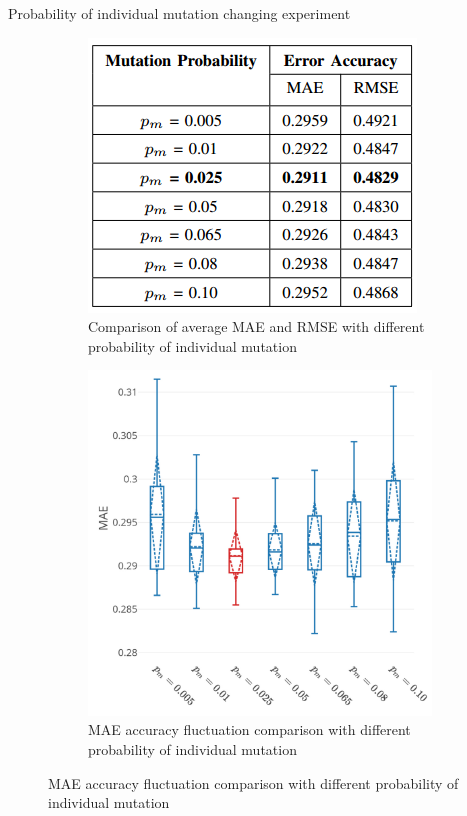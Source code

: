 \documentclass{beamer}
\newcommand{\notesize}{\fontsize{8}{10}\selectfont}
\begin{document}
\begin{frame}{Probability of individual mutation changing experiment}
	\begin{figure}
		\centering
		\begin{subfigure}{0.4\textwidth}
			\centering
			\includegraphics[width=1.0\linewidth]{pm_changing.png}
			\caption*{\notesize Comparison of average MAE and RMSE with different probability of individual mutation}
			\label{fig:sub11}
		\end{subfigure}%
		\begin{subfigure}{.6\textwidth}
			\centering
			\includegraphics[width=0.8\linewidth]{tn2_multi_cpu_best_pm.pdf}
			\caption*{\notesize MAE accuracy fluctuation comparison with different probability of individual mutation}
			\label{fig:sub21}
		\end{subfigure}%
		\label{fig:cpu_predict}
	\end{figure}
\end{frame}
\end{document}
